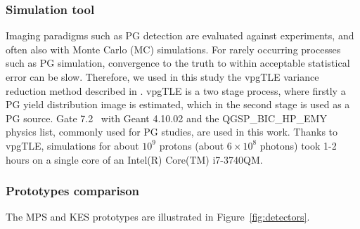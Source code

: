 \documentclass[a4paper,english,12pt]{article}
\begin{document}
\subsubsection{Simulation tool}\label{sec:SimTool}

Imaging paradigms such as PG detection are evaluated against experiments, and often also with Monte Carlo (MC) simulations. %
For rarely occurring processes such as PG simulation, convergence to the truth to within acceptable statistical error can be slow. Therefore, we used in this study the vpgTLE variance reduction method described in \cite{Huisman2016}. vpgTLE is a two stage process, where firstly a PG yield distribution image is estimated, which in the second stage is used as a PG source. Gate 7.2~\citep{Sarrut2014} with Geant 4.10.02 and the QGSP\_BIC\_HP\_EMY physics list, commonly used for PG studies, are used in this work. Thanks to vpgTLE, simulations for about $10^9$ protons (about $6\times10^8$ photons) took 1-2 hours on a single core of an Intel(R) Core(TM) i7-3740QM.


\subsubsection{Prototypes comparison}\label{sec:camera} %

The MPS and KES prototypes are illustrated in Figure~\ref{fig:detectors}.
\end{document}
